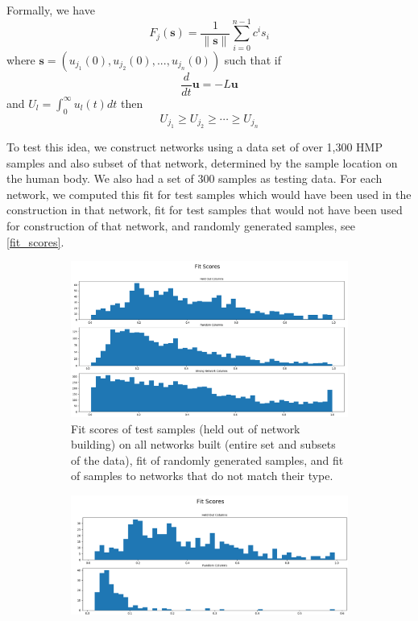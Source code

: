 \documentclass[10pt]{article}
\theoremstyle{definition}
\numberwithin{theorem}{section}
\numberwithin{definition}{section}
\numberwithin{lemma}{section}
\numberwithin{corollary}{section}
\numberwithin{clm}{section}
\numberwithin{rmk}{section}
\renewcommand{\b}{\bm}
\begin{document}
Formally, we have
\[
F_j(\b{s}) =\frac{1}{\|\b{s}\|} \sum_{i=0}^{n-1} c^i s_i
\]
where $\b{s} = (u_{j_1}(0),u_{j_2}(0),...,u_{j_n}(0))$ such that if 
\[
\frac{d}{dt}\b{u} = -L\b{u}
\]
and $U_l = \int_0^{\infty} u_l(t) dt$ then
\[
U_{j_1} \geq U_{j_2} \geq \cdots \geq U_{j_n}
\]

To test this idea, we construct networks using a data set of over 1,300 HMP samples and also subset of that network, determined by the sample location on the human body. We also had a set of 300 samples as testing data. For each network, we computed this fit for test samples which would have been used in the construction in that network, fit for test samples that would not have been used for construction of that network, and randomly generated samples, see \cref{fit_scores}.

\begin{figure}
	\begin{subfigure}{\textwidth}
	\begin{center}
	\includegraphics[scale = 0.4]{../stat_figs/merged2/species_fits_m2.png}
\end{center}
\caption{Fit scores of test samples (held out of network building) on all networks built (entire set and subsets of the data), fit of randomly generated samples, and fit of samples to networks that do not match their type.}
	\end{subfigure}
	\begin{subfigure}{\textwidth}
	\begin{center}
		\includegraphics[scale = 0.5]{../stat_figs/merged2/species_fits_full.png}

\end{center}
\end{subfigure}
\end{figure}
\end{document}
